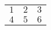 \begin{table}[ht]
	\begin{center}
	\label{tab:tmp}
		\begin{tabular}{ccc}
		\toprule
			$1$ & $2$ & $3$\\
			$4$ & $5$ & $6$\\
		\bottomrule
		\end{tabular}
	\end{center}
\end{table}